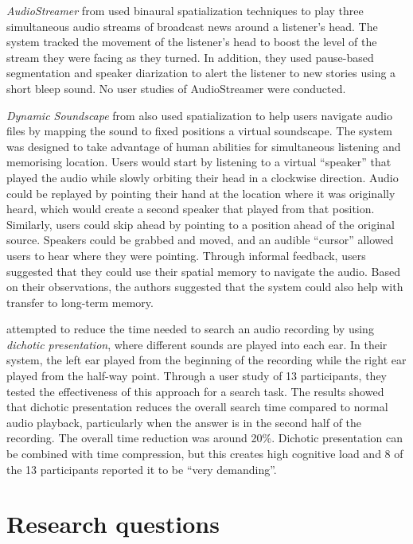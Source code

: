 \textit{AudioStreamer} from \citet{Schmandt1995} used binaural spatialization techniques to play three simultaneous
audio streams of broadcast news around a listener's head. The system tracked the movement of the listener's head to
boost the level of the stream they were facing as they turned.  In addition, they used pause-based segmentation and
speaker diarization to alert the listener to new stories using a short bleep sound. No user studies of AudioStreamer
were conducted.

\textit{Dynamic Soundscape} from \citet{Kobayashi1997} also used spatialization to help users navigate audio files by
mapping the sound to fixed positions a virtual soundscape. The system was designed to take advantage of human abilities
for simultaneous listening and memorising location. Users would start by listening to a virtual ``speaker'' that played
the audio while slowly orbiting their head in a clockwise direction. Audio could be replayed by pointing their hand 
at the location where it was originally heard, which would create a second speaker that played from that position.
Similarly, users could skip ahead by pointing to a position ahead of the original source.  Speakers could be grabbed
and moved, and an audible ``cursor'' allowed users to hear where they were pointing.  Through informal feedback, users
suggested that they could use their spatial memory to navigate the audio. Based on their observations, the authors
suggested that the system could also help with transfer to long-term memory.

\citet{Ranjan2006} attempted to reduce the time needed to search an audio recording by using \textit{dichotic
presentation}, where different sounds are played into each ear.  In their system, the left ear played from the
beginning of the recording while the right ear played from the half-way point. Through a user study of 13 participants,
they tested the effectiveness of this approach for a search task. The results showed that dichotic presentation reduces
the overall search time compared to normal audio playback, particularly when the answer is in the second half of the
recording. The overall time reduction was around 20\%.  Dichotic presentation can be combined with time
compression, but this creates high cognitive load and 8 of the 13 participants reported it to be ``very demanding''.







\clearpage
\section{Research questions}\label{sec:background-questions}

